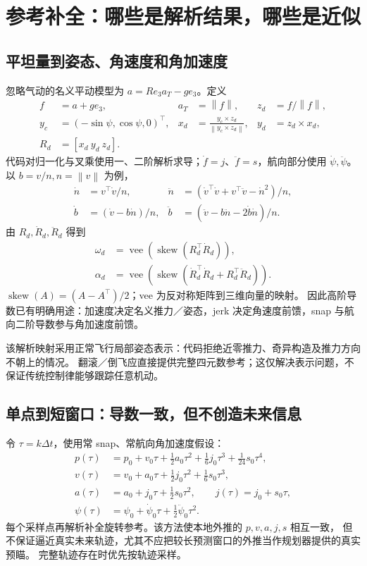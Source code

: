 \documentclass[UTF8,a4paper,11pt,fontset=fandol]{ctexart}
\newcommand{\norm}[1]{\left\lVert#1\right\rVert}
\begin{document}
\section{参考补全：哪些是解析结果，哪些是近似}
\label{sec:resolve}
\subsection{平坦量到姿态、角速度和角加速度}
忽略气动的名义平动模型为 $a=R e_3 a_T-g e_3$。定义
\begin{align}
 f&=a+g e_3, & a_T&=\norm{f}, & z_d&=f/\norm{f},\\
 y_c&=(-\sin\psi,\cos\psi,0)^\top, &
 x_d&=\frac{y_c\times z_d}{\norm{y_c\times z_d}}, & y_d&=z_d\times x_d,\\
 R_d&=[x_d\ y_d\ z_d].
\end{align}
代码对归一化与叉乘使用一、二阶解析求导；$\dot f=j$、$\ddot f=s$，航向部分使用
$\dot\psi,\ddot\psi$。以 $b=v/n,n=\norm v$ 为例，
\begin{align}
 \dot n&=v^\top\dot v/n, &
 \ddot n&=(\dot v^\top\dot v+v^\top\ddot v-\dot n^2)/n,\\
 \dot b&=(\dot v-b\dot n)/n, &
 \ddot b&=(\ddot v-b\ddot n-2\dot b\dot n)/n.
\end{align}
由 $R_d,\dot R_d,\ddot R_d$ 得到
\begin{align}
 \omega_d&=\operatorname{vee}\!\left(\operatorname{skew}(R_d^\top\dot R_d)\right),\\
 \alpha_d&=\operatorname{vee}\!\left(\operatorname{skew}(\dot R_d^\top\dot R_d+R_d^\top\ddot R_d)\right).
\end{align}
$\operatorname{skew}(A)=(A-A^\top)/2$；vee 为反对称矩阵到三维向量的映射。
因此高阶导数已有明确用途：加速度决定名义推力／姿态，jerk 决定角速度前馈，snap 与航向二阶导数参与角加速度前馈。

该解析映射采用正常飞行局部姿态表示：代码拒绝近零推力、奇异构造及推力方向不朝上的情况。
翻滚／倒飞应直接提供完整四元数参考；这仅解决表示问题，不保证传统控制律能够跟踪任意机动。

\subsection{单点到短窗口：导数一致，但不创造未来信息}
令 $\tau=k\Delta t$，使用常 snap、常航向角加速度假设：
\begin{align}
 p(\tau)&=p_0+v_0\tau+\tfrac12 a_0\tau^2+\tfrac16 j_0\tau^3+\tfrac1{24}s_0\tau^4,\\
 v(\tau)&=v_0+a_0\tau+\tfrac12j_0\tau^2+\tfrac16s_0\tau^3,\\
 a(\tau)&=a_0+j_0\tau+\tfrac12s_0\tau^2,\qquad j(\tau)=j_0+s_0\tau,\\
 \psi(\tau)&=\psi_0+\dot\psi_0\tau+\tfrac12\ddot\psi_0\tau^2.
\end{align}
每个采样点再解析补全旋转参考。该方法使本地外推的 $p,v,a,j,s$ 相互一致，
但不保证逼近真实未来轨迹，尤其不应把较长预测窗口的外推当作规划器提供的真实预瞄。
完整轨迹存在时优先按轨迹采样。
\clearpage
\end{document}

